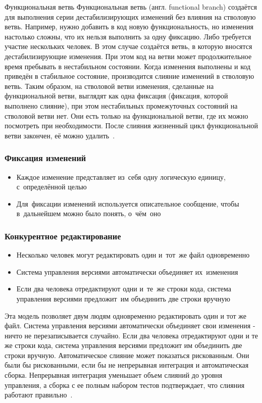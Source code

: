 \documentclass{../industrial-development}
\begin{document}
Функциональная ветвь
Функциональная ветвь (англ. functional branch) создаётся для выполнения серии дестабилизирующих изменений без влияния на стволовую ветвь. Например, нужно добавить в код новую функциональность, но изменения настолько сложны, что их нельзя выполнить за одну фиксацию. Либо требуется участие нескольких человек. В этом случае создаётся ветвь, в которую вносятся дестабилизирующие изменения. При этом код на ветви может продолжительное время пребывать в нестабильном состоянии. Когда изменения выполнены и код приведён в стабильное состояние, производится слияние изменений в стволовую ветвь. Таким образом, на стволовой ветви изменения, сделанные на функциональной ветви, выглядят как одна фиксация (фиксация, которой выполнено слияние), при этом нестабильных промежуточных состояний на стволовой ветви нет. Они есть только на функциональной ветви, где их можно посмотреть при необходимости. После слияния жизненный цикл функциональной ветви закончен, её можно удалить~\cite{Branching}.

\begin{frame} \frametitle{Фиксация изменений}
  \begin{itemize}
  \item Каждое изменение представляет из~себя одну логическую единицу, с~определённой целью
  \item Для~фиксации изменений используется описательное сообщение, чтобы в~дальнейшем можно было понять, о~чём~оно
  \end{itemize}
\end{frame}

\begin{frame} \frametitle{Конкурентное редактирование}
  \begin{itemize}
  \item Несколько человек могут редактировать один и~тот~же файл одновременно
  \item Система управления версиями автоматически объединяет их~изменения
  \item Если два человека отредактируют одни и~те~же строки кода, система управления версиями предложит~им объединить две строки вручную
  \end{itemize}
\end{frame}

\lecturenotes

Эта модель позволяет двум людям одновременно редактировать один и тот же файл. Система управления версиями автоматически объединяет свои изменения - ничто не перезаписывается случайно. Если два человека отредактируют одни и те же строки кода, система управления версиями предложит им объединить две строки вручную. Автоматическое слияние может показаться рискованным. Они были бы рискованными, если бы не непрерывная интеграция и автоматическая сборка. Непрерывная интеграция уменьшает объем слияний до уровня управления, а сборка с ее полным набором тестов подтверждает, что слияния работают правильно~\cite[170-171]{AgileDevelopment}.
\end{document}
